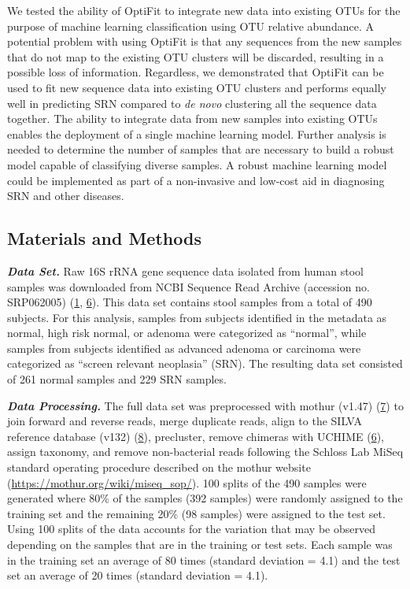 \documentclass[
]{article}
\begin{document}
We tested the ability of OptiFit to integrate new data into existing
OTUs for the purpose of machine learning classification using OTU
relative abundance. A potential problem with using OptiFit is that any
sequences from the new samples that do not map to the existing OTU
clusters will be discarded, resulting in a possible loss of information.
Regardless, we demonstrated that OptiFit can be used to fit new sequence
data into existing OTU clusters and performs equally well in predicting
SRN compared to \emph{de novo} clustering all the sequence data
together. The ability to integrate data from new samples into existing
OTUs enables the deployment of a single machine learning model. Further
analysis is needed to determine the number of samples that are necessary
to build a robust model capable of classifying diverse samples. A robust
machine learning model could be implemented as part of a non-invasive
and low-cost aid in diagnosing SRN and other diseases.

\hypertarget{materials-and-methods}{%
\subsection{Materials and Methods}\label{materials-and-methods}}

\textbf{\emph{Data Set.}} Raw 16S rRNA gene sequence data isolated from
human stool samples was downloaded from NCBI Sequence Read Archive
(accession no. SRP062005) (\protect\hyperlink{ref-baxter2016}{1},
\protect\hyperlink{ref-edgar2011}{6}). This data set contains stool
samples from a total of 490 subjects. For this analysis, samples from
subjects identified in the metadata as normal, high risk normal, or
adenoma were categorized as ``normal'', while samples from subjects
identified as advanced adenoma or carcinoma were categorized as ``screen
relevant neoplasia'' (SRN). The resulting data set consisted of 261
normal samples and 229 SRN samples.

\textbf{\emph{Data Processing.}} The full data set was preprocessed with
mothur (v1.47) (\protect\hyperlink{ref-schloss2009}{7}) to join forward
and reverse reads, merge duplicate reads, align to the SILVA reference
database (v132) (\protect\hyperlink{ref-quast2013}{8}), precluster,
remove chimeras with UCHIME (\protect\hyperlink{ref-edgar2011}{6}),
assign taxonomy, and remove non-bacterial reads following the Schloss
Lab MiSeq standard operating procedure described on the mothur website
(\url{https://mothur.org/wiki/miseq_sop/}). 100 splits of the 490
samples were generated where 80\% of the samples (392 samples) were
randomly assigned to the training set and the remaining 20\% (98
samples) were assigned to the test set. Using 100 splits of the data
accounts for the variation that may be observed depending on the samples
that are in the training or test sets. Each sample was in the training
set an average of 80 times (standard deviation = 4.1) and the test set
an average of 20 times (standard deviation = 4.1).
\end{document}
